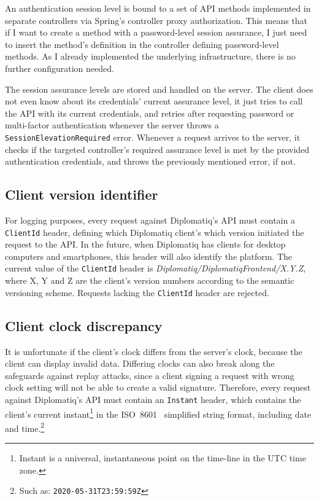 An authentication session level is bound to a set of API methods implemented in separate controllers via Spring's controller proxy authorization. This means that if I want to create a method with a password-level session assurance, I just need to insert the method's definition in the controller defining password-level methods. As I already implemented the underlying infrastructure, there is no further configuration needed.

The session assurance levels are stored and handled on the server. The client does not even know about its credentials' current assurance level, it just tries to call the API with its current credentials, and retries after requesting password or multi-factor authentication whenever the server throws a \lstinline{SessionElevationRequired} error. Whenever a request arrives to the server, it checks if the targeted controller's required assurance level is met by the provided authentication credentials, and throws the previously mentioned error, if not.

\subsection{Client version identifier}

For logging purposes, every request against Diplomatiq's API must contain a \lstinline{ClientId} header, defining which Diplomatiq client's which version initiated the request to the API. In the future, when Diplomatiq has clients for desktop computers and smartphones, this header will also identify the platform. The current value of the \lstinline{ClientId} header is \emph{Diplomatiq/DiplomatiqFrontend/X.Y.Z}, where X, Y and Z are the client's version numbers according to the semantic versioning scheme. Requests lacking the \lstinline{ClientId} header are rejected.

\subsection{Client clock discrepancy}

It is unfortunate if the client's clock differs from the server's clock, because the client can display invalid data. Differing clocks can also break along the safeguards against replay attacks, since a client signing a request with wrong clock setting will not be able to create a valid signature. Therefore, every request against Diplomatiq's API must contain an \lstinline{Instant} header, which contains the client's current instant\footnote{Instant is a universal, instantaneous point on the time-line in the UTC time zone.} in the ISO~8601~\cite{iso8601} simplified string format, including date and time.\footnote{Such as: \lstinline{2020-05-31T23:59:59Z}}

